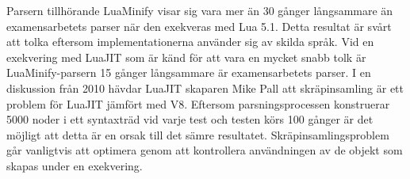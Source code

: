 Parsern tillhörande LuaMinify visar sig vara mer än 30 gånger långsammare än
examensarbetets parser när den exekveras med Lua 5.1. Detta resultat är svårt
att tolka eftersom implementationerna använder sig av skilda språk. Vid
en exekvering med LuaJIT som är känd för att vara en mycket snabb tolk är
LuaMinify-parsern 15 gånger långsammare är examensarbetets parser. I en
diskussion från 2010 hävdar LuaJIT skaparen Mike Pall \citep{mp10} att
skräpinsamling är ett problem för LuaJIT jämfört med V8.  Eftersom
parsningsprocessen konstruerar 5000 noder i ett syntaxträd vid varje test och
testen körs 100 gånger är det möjligt att detta är en orsak till det sämre
resultatet. Skräpinsamlingsproblem går vanligtvis att optimera genom att
kontrollera användningen av de objekt som skapas under en exekvering.

